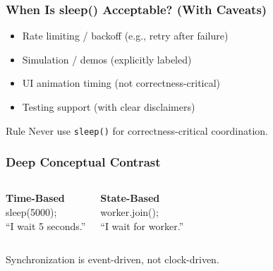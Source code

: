 \documentclass[aspectratio=169,11pt]{beamer}
\newcommand{\codebox}[1]{%
	\begingroup
	\setlength{\fboxsep}{6pt}%
	\colorbox{gray!5}{\ttfamily\small #1}%
	\endgroup
}
\begin{document}
	\begin{frame}
		\frametitle{When Is sleep() Acceptable? (With Caveats)}
		
		\begin{itemize}
			\item Rate limiting / backoff (e.g., retry after failure)
			\item Simulation / demos (explicitly labeled)
			\item UI animation timing (not correctness-critical)
			\item Testing support (with clear disclaimers)
		\end{itemize}
		
		\vspace{4mm}
		
		\begin{block}{Rule}
			Never use \texttt{sleep()} for correctness-critical coordination.
		\end{block}
		
	\end{frame}
	
	\begin{frame}
		\frametitle{Deep Conceptual Contrast}
		
		\begin{columns}
			
			\column{0.48\textwidth}
			\textbf{Time-Based}\\[2mm]
			\codebox{sleep(5000);}\\[2mm]
			\small ``I wait 5 seconds.''
			
			\column{0.48\textwidth}
			\textbf{State-Based}\\[2mm]
			\codebox{worker.join();}\\[2mm]
			\small ``I wait for worker.''
			
		\end{columns}
		
		\vspace{6mm}
		
		\begin{center}
			\Large
			Synchronization is event-driven, not clock-driven.
		\end{center}
		
	\end{frame}
	
\end{document}
